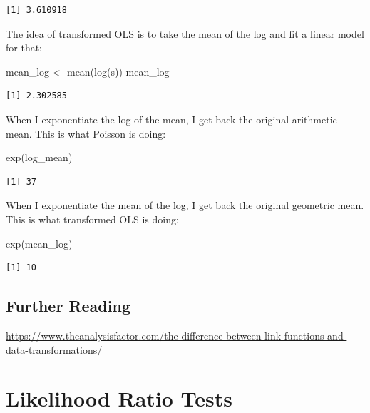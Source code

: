 \documentclass[
  letterpaper,
  DIV=11,
  numbers=noendperiod]{scrreprt}
\newenvironment{Shaded}{\begin{snugshade}}{\end{snugshade}}
\newcommand{\FunctionTok}[1]{\textcolor[rgb]{0.02,0.16,0.49}{#1}}
\newcommand{\NormalTok}[1]{\textcolor[rgb]{0.00,0.44,0.13}{#1}}
\newcommand{\OtherTok}[1]{\textcolor[rgb]{0.00,0.44,0.13}{#1}}
\begin{document}
\begin{verbatim}
[1] 3.610918
\end{verbatim}

The idea of transformed OLS is to take the mean of the log and fit a
linear model for that:

\begin{Shaded}
\begin{Highlighting}[]
\NormalTok{mean\_log }\OtherTok{\textless{}{-}} \FunctionTok{mean}\NormalTok{(}\FunctionTok{log}\NormalTok{(s))}
\NormalTok{mean\_log}
\end{Highlighting}
\end{Shaded}

\begin{verbatim}
[1] 2.302585
\end{verbatim}

When I exponentiate the log of the mean, I get back the original
arithmetic mean. This is what Poisson is doing:

\begin{Shaded}
\begin{Highlighting}[]
\FunctionTok{exp}\NormalTok{(log\_mean)}
\end{Highlighting}
\end{Shaded}

\begin{verbatim}
[1] 37
\end{verbatim}

When I exponentiate the mean of the log, I get back the original
geometric mean. This is what transformed OLS is doing:

\begin{Shaded}
\begin{Highlighting}[]
\FunctionTok{exp}\NormalTok{(mean\_log)}
\end{Highlighting}
\end{Shaded}

\begin{verbatim}
[1] 10
\end{verbatim}

\hypertarget{further-reading-3}{%
\section{Further Reading}\label{further-reading-3}}

\url{https://www.theanalysisfactor.com/the-difference-between-link-functions-and-data-transformations/}

\hypertarget{likelihood-ratio-tests}{%
\chapter{Likelihood Ratio Tests}\label{likelihood-ratio-tests}}
\end{document}
